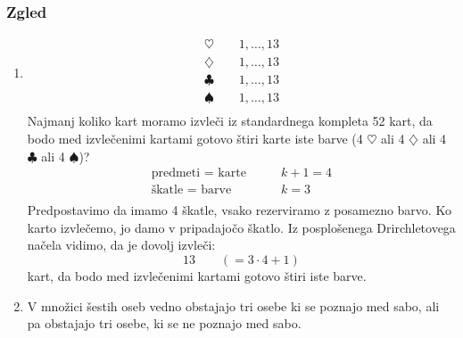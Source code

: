 \subsubsection{Zgled}
\begin{enumerate}[label=\roman*.]
    \item 
    \begin{align*}
        \heartsuit \text{ }\text{ }\text{ } 1, \dots, 13 \\
        \diamondsuit \text{ }\text{ }\text{ } 1, \dots, 13 \\
        \clubsuit \text{ }\text{ }\text{ } 1, \dots, 13 \\
        \spadesuit \text{ }\text{ }\text{ } 1, \dots, 13 \\
    \end{align*}
    Najmanj koliko kart moramo izvleči iz standardnega kompleta 52 kart, da bodo med izvlečenimi kartami gotovo štiri karte iste barve (4 $\heartsuit$ ali 4 $\diamondsuit$ ali 4 $\clubsuit$ ali 4 $\spadesuit$)?
    \begin{align*}
        \text{predmeti = karte} \text{ }\text{ }\text{ } & k + 1 = 4 \\
        \text{škatle = barve} \text{ }\text{ }\text{ } & k = 3 \\
    \end{align*}
    Predpostavimo da imamo 4 škatle, vsako rezerviramo z posamezno barvo. Ko karto izvlečemo, jo damo v pripadajočo škatlo. Iz posplošenega Drirchletovega načela vidimo, da je dovolj izvleči:
    $$
    13 \text{ }\text{ }\text{ } ( = 3 \cdot 4 + 1)
    $$
    kart, da bodo med izvlečenimi kartami gotovo štiri iste barve.
    \item V množici šestih oseb vedno obstajajo tri osebe ki se poznajo med sabo, ali pa obstajajo tri osebe, ki se ne poznajo med sabo.
    \begin{center}
\end{center}
\end{enumerate}
